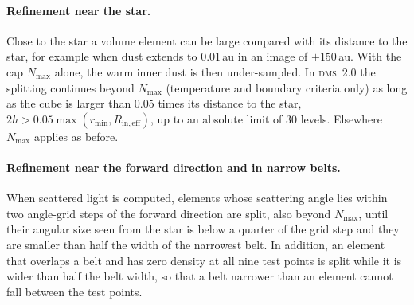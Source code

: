 \documentclass[11pt,a4paper]{article}
\newcommand{\dms}{\textsc{dms}}
\begin{document}
\paragraph{Refinement near the star.} Close to the star a volume element can be large compared
with its distance to the star, for example when dust extends to 0.01\,au in an image of
$\pm150$\,au. With the cap $N_\mathrm{max}$ alone, the warm inner dust is then under-sampled. In
\dms\ 2.0 the splitting continues beyond $N_\mathrm{max}$ (temperature and boundary criteria only) as long as
the cube is larger than $0.05$ times its distance to the star, $2h>0.05\max(r_\mathrm{min},
R_\mathrm{in,eff})$, up to an absolute limit of 30 levels. Elsewhere $N_\mathrm{max}$ applies as
before.

\paragraph{Refinement near the forward direction and in narrow belts.} When scattered light is
computed, elements whose scattering angle lies within two angle-grid steps of the forward
direction are split, also beyond $N_\mathrm{max}$, until their angular size seen from the star is
below a quarter of the grid step and they are smaller than half the width of the narrowest belt.
In addition, an element that overlaps a belt and has zero density at all nine test points is split
while it is wider than half the belt width, so that a belt narrower than an element cannot fall
between the test points.
\end{document}
